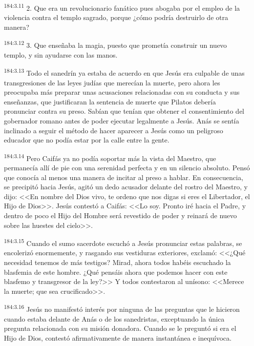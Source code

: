 \par 
\textsuperscript{184:3.11} 2. Que era un revolucionario fanático pues abogaba por el empleo de la violencia contra el templo sagrado, porque ¿cómo podría destruirlo de otra manera?

\par 
\textsuperscript{184:3.12} 3. Que enseñaba la magia, puesto que prometía construir un nuevo templo, y sin ayudarse con las manos.

\par 
\textsuperscript{184:3.13} Todo el sanedrín ya estaba de acuerdo en que Jesús era culpable de unas transgresiones de las leyes judías que merecían la muerte, pero ahora les preocupaba más preparar unas acusaciones relacionadas con su conducta y sus enseñanzas, que justificaran la sentencia de muerte que Pilatos debería pronunciar contra su preso. Sabían que tenían que obtener el consentimiento del gobernador romano antes de poder ejecutar legalmente a Jesús. Anás se sentía inclinado a seguir el método de hacer aparecer a Jesús como un peligroso educador que no podía estar por la calle entre la gente.

\par 
\textsuperscript{184:3.14} Pero Caifás ya no podía soportar más la vista del Maestro, que permanecía allí de pie con una serenidad perfecta y en un silencio absoluto. Pensó que conocía al menos una manera de incitar al preso a hablar. En consecuencia, se precipitó hacia Jesús, agitó un dedo acusador delante del rostro del Maestro, y dijo: <<En nombre del Dios vivo, te ordeno que nos digas si eres el Libertador, el Hijo de Dios>>. Jesús contestó a Caifás: <<Lo soy. Pronto iré hacia el Padre, y dentro de poco el Hijo del Hombre será revestido de poder y reinará de nuevo sobre las huestes del cielo>>.

\par 
\textsuperscript{184:3.15} Cuando el sumo sacerdote escuchó a Jesús pronunciar estas palabras, se encolerizó enormemente, y rasgando sus vestiduras exteriores, exclamó: <<¿Qué necesidad tenemos de más testigos? Mirad, ahora todos habéis escuchado la blasfemia de este hombre. ¿Qué pensáis ahora que podemos hacer con este blasfemo y transgresor de la ley?>> Y todos contestaron al unísono: <<Merece la muerte; que sea crucificado>>.

\par 
\textsuperscript{184:3.16} Jesús no manifestó interés por ninguna de las preguntas que le hicieron cuando estaba delante de Anás o de los sanedristas, exceptuando la única pregunta relacionada con su misión donadora. Cuando se le preguntó si era el Hijo de Dios, contestó afirmativamente de manera instantánea e inequívoca.

